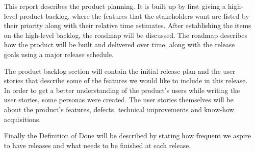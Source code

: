 This report describes the product planning. It is built up by first giving a high-level product backlog, where the features that the stakeholders want are listed by their priority along with their relative time estimates. After establishing the items on the high-level backlog, the roadmap will be discussed. The roadmap describes how the product will be built and delivered over time, along with the release goals using a major release schedule.

The product backlog section will contain the initial release plan and the user stories that describe some of the features we would like to include in this release. In order to get a better understanding of the product's users while writing the user stories, some personas were created. The user stories themselves will be about the product's features, defects, technical improvements and know-how acquisitions.

Finally the Definition of Done will be described by stating how frequent we aspire to have releases and what needs to be finished at each release.

